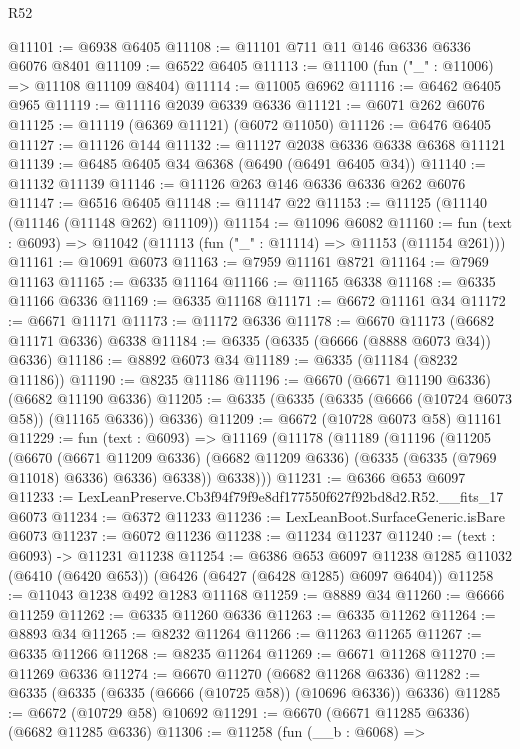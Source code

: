 \begin{lexlean}{R52}
\begin{coremodule}
@11101 := @6938 @6405
@11108 := @11101 @711 @11 @146 @6336 @6336 @6076 @8401
@11109 := @6522 @6405
@11113 := @11100 (fun ("_" : @11006) => @11108 @11109 @8404)
@11114 := @11005 @6962
@11116 := @6462 @6405 @965
@11119 := @11116 @2039 @6339 @6336
@11121 := @6071 @262 @6076
@11125 := @11119 (@6369 @11121) (@6072 @11050)
@11126 := @6476 @6405
@11127 := @11126 @144
@11132 := @11127 @2038 @6336 @6338 @6368 @11121
@11139 := @6485 @6405 @34 @6368 (@6490 (@6491 @6405 @34))
@11140 := @11132 @11139
@11146 := @11126 @263 @146 @6336 @6336 @262 @6076
@11147 := @6516 @6405
@11148 := @11147 @22
@11153 := @11125 (@11140 (@11146 (@11148 @262) @11109))
@11154 := @11096 @6082
@11160 := fun (text : @6093) => @11042 (@11113 (fun ("_" : @11114) => @11153 (@11154 @261)))
@11161 := @10691 @6073
@11163 := @7959 @11161 @8721
@11164 := @7969 @11163
@11165 := @6335 @11164
@11166 := @11165 @6338
@11168 := @6335 @11166 @6336
@11169 := @6335 @11168
@11171 := @6672 @11161 @34
@11172 := @6671 @11171
@11173 := @11172 @6336
@11178 := @6670 @11173 (@6682 @11171 @6336) @6338
@11184 := @6335 (@6335 (@6666 (@8888 @6073 @34)) @6336)
@11186 := @8892 @6073 @34
@11189 := @6335 (@11184 (@8232 @11186))
@11190 := @8235 @11186
@11196 := @6670 (@6671 @11190 @6336) (@6682 @11190 @6336)
@11205 := @6335 (@6335 (@6335 (@6666 (@10724 @6073 @58)) (@11165 @6336)) @6336)
@11209 := @6672 (@10728 @6073 @58) @11161
@11229 := fun (text : @6093) =>
  @11169
    (@11178
      (@11189
        (@11196
          (@11205
            (@6670
              (@6671 @11209 @6336)
              (@6682 @11209 @6336)
              (@6335 (@6335 (@7969 @11018) @6336) @6336)
              @6338))
          @6338)))
@11231 := @6366 @653 @6097
@11233 := LexLeanPreserve.Cb3f94f79f9e8df177550f627f92bd8d2.R52.__fits_17 @6073
@11234 := @6372 @11233
@11236 := LexLeanBoot.SurfaceGeneric.isBare @6073
@11237 := @6072 @11236
@11238 := @11234 @11237
@11240 := (text : @6093) -> @11231 @11238
@11254 := @6386
    @653
    @6097
    @11238
    @1285
    @11032
    (@6410 (@6420 @653))
    (@6426 (@6427 (@6428 @1285) @6097 @6404))
@11258 := @11043 @1238 @492 @1283 @11168
@11259 := @8889 @34
@11260 := @6666 @11259
@11262 := @6335 @11260 @6336
@11263 := @6335 @11262
@11264 := @8893 @34
@11265 := @8232 @11264
@11266 := @11263 @11265
@11267 := @6335 @11266
@11268 := @8235 @11264
@11269 := @6671 @11268
@11270 := @11269 @6336
@11274 := @6670 @11270 (@6682 @11268 @6336)
@11282 := @6335 (@6335 (@6335 (@6666 (@10725 @58)) (@10696 @6336)) @6336)
@11285 := @6672 (@10729 @58) @10692
@11291 := @6670 (@6671 @11285 @6336) (@6682 @11285 @6336)
@11306 := @11258
    (fun (__b : @6068) =>

\end{coremodule}
\end{lexlean}
